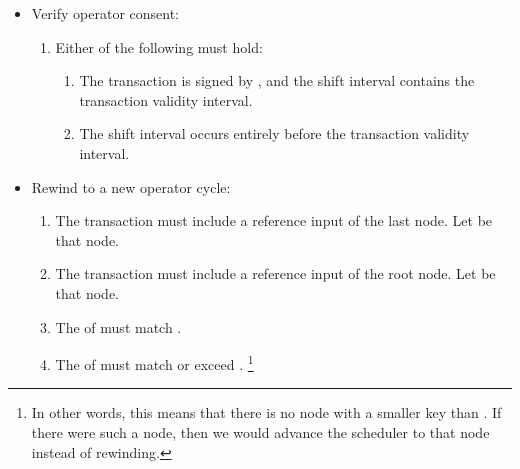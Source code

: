 \documentclass[../midgard.tex]{subfiles}
\begin{document}
\begin{description}
\begin{itemize}
            \item Verify operator consent:
            \begin{enumerate}[resume]
                \item Either of the following must hold:
                \begin{enumerate}
                    \item The transaction is signed by , and the  shift interval contains the transaction validity interval.
                    \item The  shift interval occurs entirely before the transaction validity interval.
                \end{enumerate}
            \end{enumerate}
            
            \item Rewind to a new operator cycle:
            \begin{enumerate}[resume]
                \item The transaction must include a reference input of the last  node.
                  Let  be that node.
                \item The transaction must include a reference input of the root  node.
                  Let  be that node.
                \item The  of  must match .
                \item The  of  must match or exceed .%
                \footnote{In other words, this means that there is no  node with a smaller key than .
                  If there were such a node, then we would advance the scheduler to that node instead of rewinding.}
            \end{enumerate}
            

\end{itemize}
\end{description}
\end{document}
